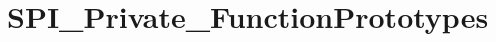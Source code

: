 \hypertarget{group___s_p_i___private___function_prototypes}{\section{S\-P\-I\-\_\-\-Private\-\_\-\-Function\-Prototypes}
\label{group___s_p_i___private___function_prototypes}
}
